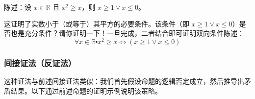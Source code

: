 \begin{example}
    \begin{center}
        陈述：设 $ x \in \mathbb{R}$ 且 $x^2 \ge x$，则 $x \ge 1 \lor x \le 0$。
    \end{center}

    \begin{center}
        \noindent {}
    \end{center}

    这证明了实数小于（或等于）其平方的必要条件。该条件（即 $x \ge 1 \lor x \le 0$）是否也是充分条件？请你证明一下！一旦完成，二者结合即可证明双向条件陈述：
    \[\forall x \in \mathbb{R} \centerdot x^2 \ge x \iff (x \ge 1 \lor x \le 0)\]
\end{example}

\subsubsection*{间接证法（反证法）}

这种证法与前述间接证法类似：我们首先假设命题的逻辑否定成立，然后推导出矛盾结果。以下通过前述命题的证明示例说明该策略。

\begin{center}
    \noindent {}
\end{center}


